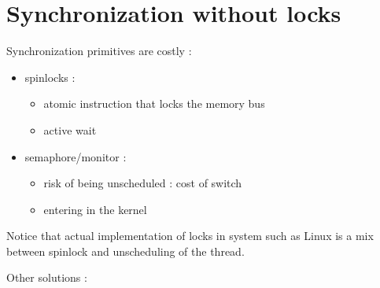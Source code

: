 \chapter{Synchronization without locks}

Synchronization primitives are costly :
\begin{itemize}
  \item spinlocks :
  \begin{itemize}
    \item atomic instruction that locks the memory bus
    \item active wait
  \end{itemize}
  \item semaphore/monitor :
  \begin{itemize}
    \item risk of being unscheduled : cost of switch
    \item entering in the kernel
  \end{itemize}
\end{itemize}

Notice that actual implementation of locks in system such as Linux is a mix between spinlock and unscheduling of the thread.

Other solutions :

